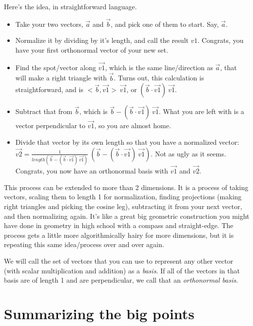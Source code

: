 \documentclass[
]{book}
\providecommand{\tightlist}{%
  \setlength{\itemsep}{0pt}\setlength{\parskip}{0pt}}
\begin{document}
Here's the idea, in straightforward language.

\begin{itemize}
\tightlist
\item
  Take your two vectors, \(\vec{a}\) and \(\vec{b}\), and pick one of them to start. Say, \(\vec{a}\).
\item
  Normalize it by dividing by it's length, and call the result \(v1\). Congrats, you have your first orthonormal vector of your new set.
\item
  Find the spot/vector along \(\vec{v1}\), which is the same line/direction as \(\vec{a}\), that will make a right triangle with \(\vec{b}\). Turns out, this calculation is straightforward, and is \(<\vec{b},\vec{v1}>\ \vec{v1}\), or \((\vec{b}\cdot\vec{v1})\ \vec{v1}\).
\item
  Subtract that from \(\vec{b}\), which is \(\vec{b} - (\vec{b}\cdot\vec{v1})\ \vec{v1}\). What you are left with is a vector perpendicular to \(\vec{v1}\), so you are almost home.
\item
  Divide that vector by its own length so that you have a normalized vector: \(\vec{v2} = \frac{1}{length(\vec{b} - (\vec{b}\cdot\vec{v1})\ \vec{v1})}\ (\vec{b} - (\vec{b}\cdot\vec{v1})\ \vec{v1})\). Not as ugly as it seems. Congrats, you now have an orthonormal basis with \(\vec{v1}\) and \(\vec{v2}\).
\end{itemize}

This process can be extended to more than 2 dimensions. It is a process of taking vectors, scaling them to length 1 for normalization, finding projections (making right triangles and picking the cosine leg), subtracting it from your next vector, and then normalizing again. It's like a great big geometric construction you might have done in geometry in high school with a compass and straight-edge. The process gets a little more algorithmically hairy for more dimensions, but it is repeating this same idea/process over and over again.

We will call the set of vectors that you can use to represent any other vector (with scalar multiplication and addition) as a \emph{basis}. If all of the vectors in that basis are of length 1 and are perpendicular, we call that an \emph{orthonormal basis}.

\hypertarget{summarizing-the-big-points-1}{%
\section{Summarizing the big points}\label{summarizing-the-big-points-1}}
\end{document}
